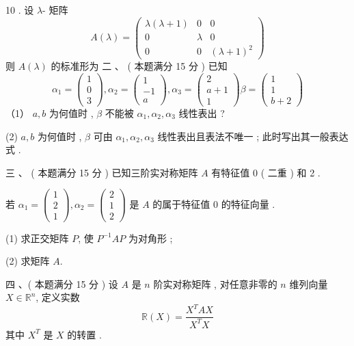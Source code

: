 \documentclass[10pt]{article}
\begin{document}
{10 .  设  $\lambda$- 矩阵 
$$
A(\lambda)=\left(\begin{array}{ccc}
\lambda(\lambda+1) & 0 & 0 \\
0 & \lambda & 0 \\
0 & 0 & (\lambda+1)^{2}
\end{array}\right)
$$
 则  $A(\lambda)$  的标准形为   二 、 ( 本题满分  15  分 )  已知 
$$
\alpha_{1}=\left(\begin{array}{l}
1 \\
0 \\
3
\end{array}\right), \alpha_{2}=\left(\begin{array}{c}
1 \\
-1 \\
a
\end{array}\right), \alpha_{3}=\left(\begin{array}{c}
2 \\
a+1 \\
1
\end{array}\right) \beta=\left(\begin{array}{c}
1 \\
1 \\
b+2
\end{array}\right)
$$
（1） $a, b$  为何值时 , $\beta$  不能被  $\alpha_{1}, \alpha_{2}, \alpha_{3}$  线性表出 ?

(2) $a, b$  为何值时 , $\beta$  可由  $\alpha_{1}, \alpha_{2}, \alpha_{3}$  线性表出且表法不唯一 ;  此时写出其一般表达式 .

 三 、 ( 本题满分  15  分 )  已知三阶实对称矩阵  $A$  有特征值  0 ( 二重 )  和  2 .

 若  $\alpha_{1}=\left(\begin{array}{c}1 \\ 2 \\ 1\end{array}\right), \alpha_{2}=\left(\begin{array}{l}2 \\ 1 \\ 2\end{array}\right)$  是  $A$  的属于特征值  0  的特征向量 .

(1)  求正交矩阵  $P$,  使  $P^{-1} A P$  为对角形 ;

(2)  求矩阵  $A$.

 四 、( 本题满分  15  分 )  设  $A$  是  $n$  阶实对称矩阵 ,  对任意非零的  $n$  维列向量  $X \in \mathbb{R}^{n}$,  定义实数 
$$
\mathbb{R}(X)=\frac{X^{T} A X}{X^{T} X}
$$
 其中  $X^{T}$  是  $X$  的转置 .

}
\end{document}
